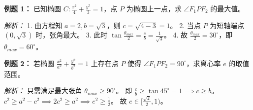 \begin{examplebox}
\textbf{例题 1：} 已知椭圆 $C: \frac{x^2}{4} + \frac{y^2}{3} = 1$，点 $P$ 为椭圆上一点，求 $\angle F_1PF_2$ 的最大值。

\textit{解析：} 
1. 由方程知 $a=2, b=\sqrt{3}$，则 $c = \sqrt{4-3} = 1$。
2. 当点 $P$ 为短轴端点 $(0, \sqrt{3})$ 时，张角最大。
3. 此时 $\tan \frac{\theta_{max}}{2} = \frac{c}{b} = \frac{1}{\sqrt{3}}$。
4. 故 $\frac{\theta_{max}}{2} = 30^\circ$，即 $\theta_{max} = 60^\circ$。

\textbf{例题 2：} 若椭圆 $\frac{x^2}{a^2} + \frac{y^2}{b^2} = 1$ 上存在点 $P$ 使得 $\angle F_1PF_2 = 90^\circ$，求离心率 $e$ 的取值范围。

\textit{解析：}
只需满足最大张角 $\theta_{max} \ge 90^\circ$。
即 $\frac{c}{b} \ge \tan 45^\circ = 1 \implies c \ge b$。
$c^2 \ge a^2 - c^2 \implies 2c^2 \ge a^2 \implies e^2 \ge \frac{1}{2}$。
故 $e \in [\frac{\sqrt{2}}{2}, 1)$。
\end{examplebox}